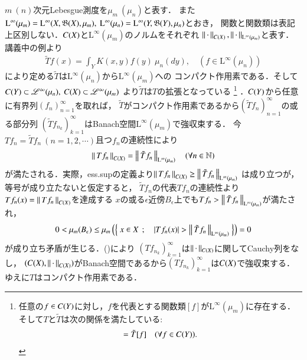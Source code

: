 	\begin{prf}
		$m\ (n)$次元Lebesgue測度を$\mu_m\ (\mu_n)$と表す．
		また$\mathrm{L}^\infty(\mu_m) = \mathrm{L}^\infty(X,\borel{X},\mu_m),\ 
		\mathrm{L}^\infty(\mu_n) = \mathrm{L}^\infty(Y,\borel{Y},\mu_n)$とおき，
		関数と関数類は表記上区別しない．$C(X)$と$\mathrm{L}^\infty(\mu_m)$のノルムをそれぞれ
		$\left\|\, \cdot\, \right\|_{C(X)},\left\|\, \cdot\, \right\|_{\mathrm{L}^\infty(\mu_m)}$と表す．
		講義中の例より
		\begin{align}
			\tilde{T}f (x) = \int_Y K(x,y) f(y)\ \mu_n(dy),
			\quad \left( f \in \mathrm{L}^\infty(\mu_n) \right)
		\end{align}
		により定める$\tilde{T}$は$\mathrm{L}^\infty(\mu_n)$から$\mathrm{L}^\infty(\mu_m)$への
		コンパクト作用素である．そして$C(Y) \subset \mathscr{L}^\infty(\mu_n),\ C(X) \subset \mathscr{L}^\infty(\mu_m)$
		より$\tilde{T}$は$T$の拡張となっている
		\footnote{
			任意の$f \in C(Y)$に対し，$f$を代表とする関数類$[f]$が$\mathrm{L}^\infty(\mu_m)$に存在する．
			そして$T$と$\tilde{T}$は次の関係を満たしている:
			\begin{align}
				[Tf] = \tilde{T}[f]
				\quad (\forall f \in \c{Y}).
			\end{align}
		}
		．$C(Y)$から任意に有界列$(f_n)_{n=1}^{\infty}$を取れば，
		$\tilde{T}$がコンパクト作用素であるから$\left( \tilde{T} f_n \right)_{n=1}^{\infty}$の或る部分列
		$\left( \tilde{T} f_{n_k} \right)_{k=1}^{\infty}$はBanach空間$\mathrm{L}^\infty(\mu_m)$で強収束する．
		今$T f_n = \tilde{T} f_n\ (n=1,2,\cdots)$且つ$f_n$の連続性により
		\begin{align}
			\left\|\, T f_n\, \right\|_{C(X)} = \left\|\, \tilde{T}f_n\, \right\|_{\mathrm{L}^\infty(\mu_m)} 
			\quad (\forall n \in \mathbb{N})
			\label{eq:report_5}
		\end{align}
		が満たされる．実際，ess.supの定義より$\left\|\, T f_n\, \right\|_{C(X)} \geq \left\|\, \tilde{T}f_n\, \right\|_{\mathrm{L}^\infty(\mu_m)}$
		は成り立つが，等号が成り立たないと仮定すると，
		$\tilde{T}f_n$の代表$T f_n$の連続性より$T f_n(x) = \left\|\, T f_n\, \right\|_{C(X)}$を達成する
		$x$の或る$\epsilon$近傍$B_\epsilon$上でも$Tf_n > \left\|\, \tilde{T}f_n\, \right\|_{\mathrm{L}^\infty(\mu_m)}$が満たされ，
		\begin{align}
			0 < \mu_m(B_\epsilon) \leq \mu_m \left( \left\{\ x \in X\ \, ; \quad \left| Tf_n(x) \right| > \left\|\, \tilde{T}f_n\, \right\|_{\mathrm{L}^\infty(\mu_m)}\ \right\} \right) = 0
		\end{align}
		が成り立ち矛盾が生じる．()により
		$\left( T f_{n_k} \right)_{k=1}^{\infty}$は$\left\|\, \cdot\, \right\|_{C(X)}$に関してCauchy列をなし，
		$(C(X),\left\|\, \cdot\, \right\|_{C(X)})$がBanach空間であるから$\left( T f_{n_k} \right)_{k=1}^{\infty}$は$C(X)$で強収束する．
		ゆえに$T$はコンパクト作用素である．
		\QED
	\end{prf}
	
